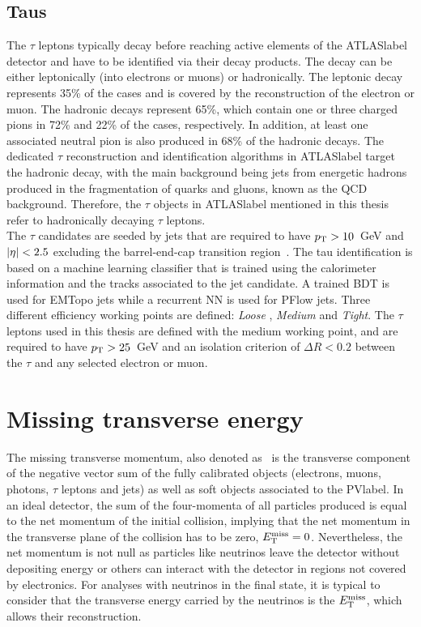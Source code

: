 \subsection{Taus}

The $\tau$ leptons typically decay before reaching active elements of the \acrshort{ATLASlabel} detector and have to be identified via their decay products. The decay can be either leptonically (into electrons or muons) or hadronically. The leptonic decay represents 35\% of the cases and is covered by the reconstruction of the electron or muon. The hadronic decays represent 65\%, which contain one or three charged pions in 72\% and 22\% of the cases, respectively. In addition, at least one associated neutral pion is also produced in 68\% of the hadronic decays. The dedicated $\tau$ reconstruction and identification algorithms in \acrshort{ATLASlabel} target the hadronic decay, with the main background being jets from energetic hadrons produced in the fragmentation of quarks and gluons, known as the \acrshort{QCD} background. Therefore, the $\tau$ objects in \acrshort{ATLASlabel} mentioned in this thesis refer to hadronically decaying $\tau$ leptons.\\

The $\tau$ candidates are seeded by jets that are required to have $p_{\text{T}} > 10$~GeV and $\abs{\eta} < 2.5$ excluding the barrel-end-cap transition region~\cite{ATLAS-CONF-2017-029}. The tau identification is based on a machine learning classifier that is trained using the calorimeter information and the tracks associated to the jet candidate. A trained BDT is used for EMTopo jets while a recurrent NN is used for PFlow jets. Three different efficiency working points are defined: \textit{Loose
}, \textit{Medium} and \textit{Tight}. The $\tau$ leptons used in this thesis are defined with the medium working point, and are required to have $p_{\text{T}}>25$~GeV and an isolation criterion of $\Delta R<0.2$ between the $\tau$ and any selected electron or muon.

\section{Missing transverse energy}

The missing transverse momentum, also denoted as \MET\ is the transverse component of the negative vector sum of the fully calibrated objects (electrons, muons, photons, $\tau$ leptons and jets) as well as soft objects associated to the \acrshort{PVlabel}. In an ideal detector, the sum of the four-momenta of all particles produced is equal to the net momentum of the initial collision, implying that the net momentum in the transverse plane of the collision has to be zero, $E_{\text{T}}^{\text{miss}}=0$. Nevertheless, the net momentum is not null as particles like neutrinos leave the detector without depositing energy or others can interact with the detector in regions not covered by electronics. For analyses with neutrinos in the final state, it is typical to consider that the transverse energy carried by the neutrinos is the $E_{\text{T}}^{\text{miss}}$, which allows their reconstruction.
